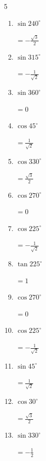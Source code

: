 \begin{multicols}{5}
\begin{enumerate}
  \item $\displaystyle \sin{240^\circ}$

        $\displaystyle =-\frac{\sqrt{3}}{2}$

  \item $\displaystyle \sin{315^\circ}$

        $\displaystyle =-\frac{1}{\sqrt{2}}$

  \item $\displaystyle \sin{360^\circ}$

        $\displaystyle =0$

  \item $\displaystyle \cos{45^\circ}$

        $\displaystyle =\frac{1}{\sqrt{2}}$

  \item $\displaystyle \cos{330^\circ}$

        $\displaystyle =\frac{\sqrt{3}}{2}$

  \item $\displaystyle \cos{270^\circ}$

        $\displaystyle =0$

  \item $\displaystyle \cos{225^\circ}$

        $\displaystyle =-\frac{1}{\sqrt{2}}$

  \item $\displaystyle \tan{225^\circ}$

        $\displaystyle =1$

  \item $\displaystyle \cos{270^\circ}$

        $\displaystyle =0$

  \item $\displaystyle \cos{225^\circ}$

        $\displaystyle =-\frac{1}{\sqrt{2}}$

  \item $\displaystyle \sin{45^\circ}$

        $\displaystyle =\frac{1}{\sqrt{2}}$

  \item $\displaystyle \cos{30^\circ}$

        $\displaystyle =\frac{\sqrt{3}}{2}$

\columnbreak %

  \item $\displaystyle \sin{330^\circ}$

        $\displaystyle =-\frac{1}{2}$


\end{enumerate}
\end{multicols}
